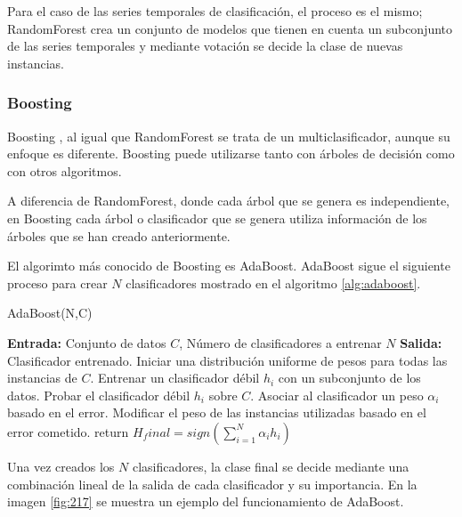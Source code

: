 Para el caso de las series temporales de clasificación, el proceso es el mismo; RandomForest crea un conjunto de modelos que tienen en cuenta un subconjunto de las series temporales y mediante votación se decide la clase de nuevas instancias.

\subsubsection{Boosting}
Boosting \cite{schapire1999brief}, al igual que RandomForest se trata de un multiclasificador, aunque su enfoque es diferente. Boosting puede utilizarse tanto con árboles de decisión como con otros algoritmos.\newline

A diferencia de RandomForest, donde cada árbol que se genera es independiente, en Boosting cada árbol o clasificador que se genera utiliza información de los árboles que se han creado anteriormente.\newline

El algorimto más conocido de Boosting es AdaBoost. AdaBoost sigue el siguiente proceso para crear $N$ clasificadores mostrado en el algoritmo \ref{alg:adaboost}. \newline

\begin{algorithm}[H]
	\caption{AdaBoost(N,C)}
	\label{alg:adaboost}
	\begin{algorithmic}[0]
		\State \textbf{Entrada:} Conjunto de datos $C$, Número de clasificadores a entrenar $N$
		\State \textbf{Salida:} Clasificador entrenado.
		\State Iniciar una distribución uniforme de pesos para todas las instancias de $C$.
			\State Entrenar un clasificador débil $h_i$ con un subconjunto de los datos.
			\State Probar el clasificador débil $h_i$ sobre $C$.
			\State Asociar al clasificador un peso $\alpha_i$ basado en el error.
			\State Modificar el peso de las instancias utilizadas basado en el error cometido.
		\EndFor
		\State return $H_final = sign(\sum_{i=1}^{N}\alpha_ih_i)$
	\end{algorithmic}
\end{algorithm}
\verticalspace

Una vez creados los $N$ clasificadores, la clase final se decide mediante una combinación lineal de la salida de cada clasificador y su importancia. En la imagen \ref{fig:217} se muestra un ejemplo del funcionamiento de AdaBoost.\newline

